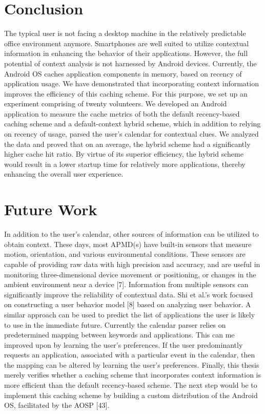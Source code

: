 \documentclass[12pt]{uthesis-v12}  %
\begin{document}
\chapter{Conclusion}
	The typical user is not facing a desktop machine in the relatively predictable office environment anymore. Smartphones are well suited to utilize contextual information in enhancing the behavior of their applications. However, the full potential of context analysis is not harnessed by Android devices. Currently, the Android OS caches application components in memory, based on recency of application usage. We have demonstrated that incorporating context information improves the efficiency of this caching scheme. For this purpose, we set up an experiment comprising of twenty volunteers. We developed an Android application to measure the cache metrics of both the default recency-based caching scheme and a default-context hybrid scheme, which in addition to relying on recency of usage, parsed the user's calendar for contextual clues. We analyzed the data and proved that on an average, the hybrid scheme had a significantly higher cache hit ratio. By virtue of its superior efficiency, the hybrid scheme would result in a lower startup time for relatively more applications, thereby enhancing the overall user experience.
		
\chapter{Future Work}		
	In addition to the user's calendar, other sources of information can be utilized to obtain context. These days, most APMD(s) have built-in sensors that measure motion, orientation, and various environmental conditions. These sensors are capable of providing raw data with high precision and accuracy, and are useful in monitoring three-dimensional device movement or positioning, or changes in the ambient environment near a device [7]. Information from multiple sensors can significantly improve the reliability of contextual data. Shi et al.'s work focused on constructing a user behavior model [8] based on analyzing user behavior. A similar approach can be used to predict the list of applications the user is likely to use in the immediate future. Currently the calendar parser relies on predetermined mapping between keywords and applications. This can me improved upon by learning the user's preferences. If the user predominantly requests an application, associated with a particular event in the calendar, then the mapping can be altered by learning the user's preferences. Finally, this thesis merely verifies whether a caching scheme that incorporates context information is more efficient than the default recency-based scheme. The next step would be to implement this caching scheme by building a custom distribution of the Android OS, facilitated by the AOSP [43].
\end{document}
